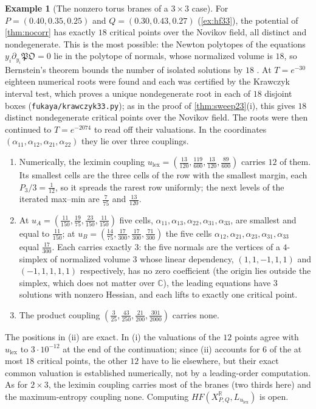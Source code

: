 \documentclass[11pt]{article}
\theoremstyle{definition}
\newtheorem{example}[theorem]{Example}
\theoremstyle{remark}
\newcommand{\R}{\mathbb{R}}
\begin{document}
\begin{example}[The nonzero torus branes of a $3\times3$ case]\label{ex:hf33crit}
For $P=(0.40,0.35,0.25)$ and $Q=(0.30,0.43,0.27)$ (\cref{ex:hf33}), the potential of \cref{thm:nocorr} has exactly $18$ critical points over the Novikov field,
all distinct and nondegenerate. This is the most possible: the Newton polytopes of the equations $y_i\partial_{y_i}\mathfrak{PO}=0$ lie in the polytope of normals, whose normalized volume is
$18$, so Bernstein's theorem bounds the number of isolated solutions by $18$ \cite{Bernstein1975,Kushnirenko1976}. At $T=e^{-30}$ eighteen numerical roots were found and each was certified by the Krawczyk interval test, which proves a unique
nondegenerate root in each of $18$ disjoint boxes (\texttt{fukaya/krawczyk33.py}); as in the proof of \cref{thm:sweep23}(i), this gives $18$
distinct nondegenerate critical points over the Novikov field. The roots were then continued to $T=e^{-2074}$ to read off their valuations.
In the coordinates $(\alpha_{11},\alpha_{12},\alpha_{21},\alpha_{22})$ they lie over three couplings.
\begin{enumerate}[label=(\roman*)]
\item Numerically, the leximin coupling $u_{\mathrm{lex}}=(\frac{13}{120},\frac{119}{600},\frac{13}{120},\frac{89}{600})$ carries $12$ of them. Its smallest cells are the
  three cells of the row with the smallest margin, each $P_3/3=\frac1{12}$, so it spreads the rarest row uniformly; the next levels of the
  iterated max--min are $\frac7{75}$ and $\frac{13}{120}$.
\item At $u_A=(\frac{11}{150},\frac{19}{75},\frac{23}{150},\frac{11}{150})$ five cells, $\alpha_{11},\alpha_{13},\alpha_{22},\alpha_{31},\alpha_{33}$, are smallest and
  equal to $\frac{11}{150}$; at $u_B=(\frac{14}{75},\frac{17}{300},\frac{17}{300},\frac{71}{300})$ the five cells $\alpha_{12},\alpha_{21},\alpha_{23},\alpha_{31},\alpha_{33}$ equal
  $\frac{17}{300}$. Each carries exactly $3$: the five normals are the vertices of a $4$-simplex of normalized volume $3$ whose linear dependency,
  $(1,1,-1,1,1)$ and $(-1,1,1,1,1)$ respectively, has no zero coefficient (the origin lies outside the simplex, which does not matter over
  $\mathbb C$), the leading equations have $3$ solutions with nonzero Hessian, and each lifts to exactly one critical point.
\item The product coupling $(\frac3{25},\frac{43}{250},\frac{21}{200},\frac{301}{2000})$ carries none.
\end{enumerate}
The positions in (ii) are exact. In (i) the valuations of the $12$ points agree with $u_{\mathrm{lex}}$ to $3\cdot10^{-12}$ at the end of the continuation;
since (ii) accounts for $6$ of the at most $18$ critical points, the other $12$ have to lie elsewhere, but their exact common valuation is
established numerically, not by a leading-order computation. As for $2\times3$, the leximin coupling carries most of the branes (two thirds here)
and the maximum-entropy coupling none. Computing $HF(X^{\R}_{P,Q},L_{u_{\mathrm{lex}}})$ is open.
\end{example}
\end{document}
